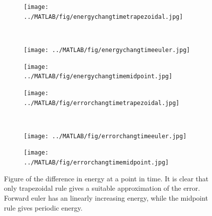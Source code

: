 \begin{figure}[H]
        \centering
        \begin{subfigure}[b]{0.30\textwidth}
                \texttt{[image: ../MATLAB/fig/energychangtimetrapezoidal.jpg]}
                \caption{  }
                \label{fig:errortrapc}
        \end{subfigure}%
        ~
        \begin{subfigure}[b]{0.30\textwidth}
                \texttt{[image: ../MATLAB/fig/energychangtimeeuler.jpg]}
                \caption{  }
                \label{fig:erroreulc}
        \end{subfigure}
        \begin{subfigure}[b]{0.30\textwidth}
                \texttt{[image: ../MATLAB/fig/energychangtimemidpoint.jpg]}
                \caption{  }
                \label{fig:errormicd}
        \end{subfigure}
        
        \begin{subfigure}[b]{0.30\textwidth}
                \texttt{[image: ../MATLAB/fig/errorchangtimetrapezoidal.jpg]}
                \caption{  }
                \label{fig:errortrapc}
        \end{subfigure}%
        ~
        \begin{subfigure}[b]{0.30\textwidth}
                \texttt{[image: ../MATLAB/fig/errorchangtimeeuler.jpg]}
                \caption{  }
                \label{fig:erroreulc}
        \end{subfigure}
        \begin{subfigure}[b]{0.30\textwidth}
                \texttt{[image: ../MATLAB/fig/errorchangtimemidpoint.jpg]}
                \caption{  }
                \label{fig:errormidc}
        \end{subfigure}
        \caption{Figure of the difference in energy at a point in time. It is clear that only trapezoidal rule gives a suitable approximation of the error. Forward euler has an linearly increasing energy, while the midpoint rule gives periodic energy.}
        \label{fig:error}
\end{figure}